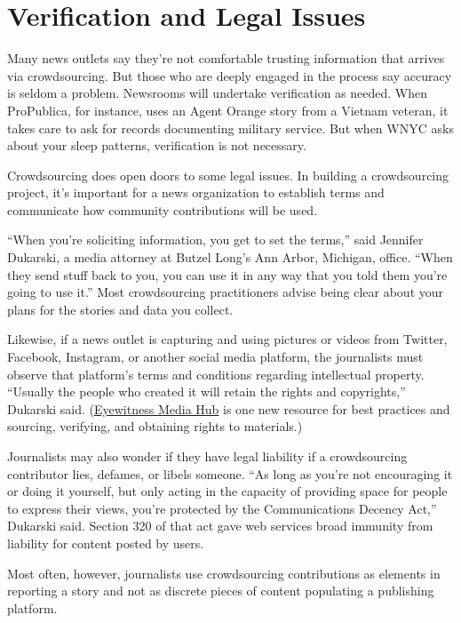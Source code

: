 \documentclass[notoc, symmetric, nobib, nols]{towcenter-guideto-book}
\begin{document}
\chapter{Verification and Legal Issues}

Many news outlets say they're not comfortable trusting information that arrives via crowdsourcing. But those who are deeply engaged in the process say accuracy is seldom a problem. Newsrooms will undertake verification as needed. When ProPublica, for instance, uses an Agent Orange story from a Vietnam veteran, it takes care to ask for records documenting military service. But when WNYC asks about your sleep patterns, verification is not necessary.

Crowdsourcing does open doors to some legal issues. In building a crowdsourcing project, it's important for a news organization to establish terms and communicate how community contributions will be used. 

``When you're soliciting information, you get to set the terms,'' said Jennifer Dukarski, a media attorney at Butzel Long's Ann Arbor, Michigan, office. ``When they send stuff back to you, you can use it in any way that you told them you're going to use it.''%
 Most crowdsourcing practitioners advise being clear about your plans for the stories and data you collect.

Likewise, if a news outlet is capturing and using pictures or videos from Twitter, Facebook, Instagram, or another social media platform, the journalists must observe that platform's terms and conditions regarding intellectual property. ``Usually the people who created it will retain the rights and copyrights,'' Dukarski said. (\href{http://eyewitnessmediahub.com/%5D}{Eyewitness Media Hub} is one new resource for best practices and sourcing, verifying, and obtaining rights to materials.)%

Journalists may also wonder if they have legal liability if a crowdsourcing contributor lies, defames, or libels someone. ``As long as you're not encouraging it or doing it yourself, but only acting in the capacity of providing space for people to express their views, you're protected by the Communications Decency Act,'' Dukarski said. Section 320 of that act gave web services broad immunity from liability for content posted by users. 

Most often, however, journalists use crowdsourcing contributions as elements in reporting a story and not as discrete pieces of content populating a publishing platform.
\end{document}
